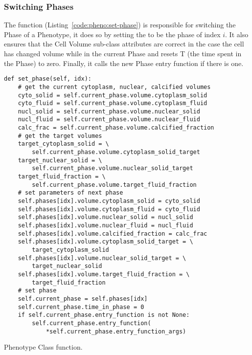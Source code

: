 \subsubsection{Switching Phases}\label{sec:meth:pheno:set-phase}

The  function (Listing~\ref{code:pheno:set-phase}) is responsible for switching the Phase of a Phenotype, it does so by setting the  to be the phase of index $i$. It also ensures that the Cell Volume sub-class attributes are correct in the case the cell has changed volume while in the current Phase and resets T (the time spent in the Phase) to zero. Finally, it calls the new Phase entry function if there is one.

\begin{listing}[!htbp]
\begin{verbatim}
def set_phase(self, idx):
    # get the current cytoplasm, nuclear, calcified volumes
    cyto_solid = self.current_phase.volume.cytoplasm_solid
    cyto_fluid = self.current_phase.volume.cytoplasm_fluid
    nucl_solid = self.current_phase.volume.nuclear_solid
    nucl_fluid = self.current_phase.volume.nuclear_fluid
    calc_frac = self.current_phase.volume.calcified_fraction
    # get the target volumes
    target_cytoplasm_solid = \
        self.current_phase.volume.cytoplasm_solid_target
    target_nuclear_solid = \
        self.current_phase.volume.nuclear_solid_target
    target_fluid_fraction = \
        self.current_phase.volume.target_fluid_fraction
    # set parameters of next phase
    self.phases[idx].volume.cytoplasm_solid = cyto_solid
    self.phases[idx].volume.cytoplasm_fluid = cyto_fluid
    self.phases[idx].volume.nuclear_solid = nucl_solid
    self.phases[idx].volume.nuclear_fluid = nucl_fluid
    self.phases[idx].volume.calcified_fraction = calc_frac
    self.phases[idx].volume.cytoplasm_solid_target = \
        target_cytoplasm_solid
    self.phases[idx].volume.nuclear_solid_target = \    
        target_nuclear_solid
    self.phases[idx].volume.target_fluid_fraction = \
        target_fluid_fraction
    # set phase
    self.current_phase = self.phases[idx]
    self.current_phase.time_in_phase = 0
    if self.current_phase.entry_function is not None:
        self.current_phase.entry_function(
            *self.current_phase.entry_function_args)
\end{verbatim}
\caption{Phenotype Class \code{set\_phase} function.}\label{code:pheno:set-phase}
\end{listing}


